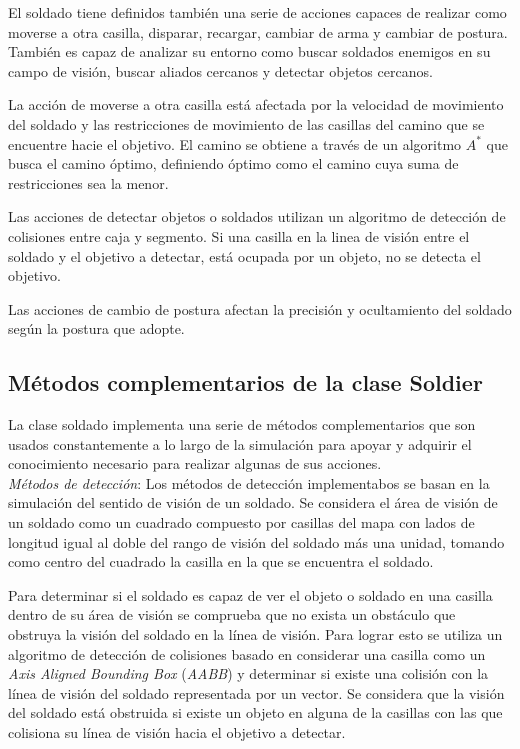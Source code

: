 \documentclass[twoside]{article}
\begin{document}
		El soldado tiene definidos tambi\'en una serie de acciones capaces de realizar como moverse a otra casilla, disparar, recargar, cambiar de arma y cambiar de postura. Tambi\'en es capaz de analizar su entorno como buscar soldados enemigos en su campo de visi\'on, buscar aliados cercanos y detectar objetos cercanos.
		
		La acci\'on de moverse a otra casilla est\'a afectada por la velocidad de movimiento del soldado y las restricciones de movimiento de las casillas del camino que se encuentre hacie el objetivo. El camino se obtiene a trav\'es de un algoritmo $A^*$ que busca el camino \'optimo, definiendo \'optimo como el camino cuya suma de restricciones sea la menor.
		
		Las acciones de detectar objetos o soldados utilizan un algoritmo de detecci\'on de colisiones entre caja y segmento. Si una casilla en la linea de visi\'on entre el soldado y el objetivo a detectar, est\'a ocupada por un objeto, no se detecta el objetivo.
		
		Las acciones de cambio de postura afectan la precisi\'on y ocultamiento del soldado seg\'un la postura que adopte.
		
		\subsection{M\'etodos complementarios de la clase Soldier}
		
		La clase soldado implementa una serie de m\'etodos complementarios que son usados constantemente a lo largo de la simulaci\'on para apoyar y adquirir el conocimiento necesario para realizar algunas de sus acciones.\\
		
		\emph{M\'etodos de detecci\'on}: Los m\'etodos de detecci\'on implementabos se basan en la simulaci\'on del sentido de visi\'on de un soldado. Se considera el \'area de visi\'on de un soldado como un cuadrado compuesto por casillas del mapa con lados de longitud igual al doble del rango de visi\'on del soldado m\'as una unidad, tomando como centro del cuadrado la casilla en la que se encuentra el soldado. 
		
		Para determinar si el soldado es capaz de ver el objeto o soldado en una casilla dentro de su \'area de visi\'on se comprueba que no exista un obst\'aculo que obstruya la visi\'on del soldado en la l\'inea de visi\'on. Para lograr esto se utiliza un algoritmo de detecci\'on de colisiones basado en considerar una casilla como un \emph{Axis Aligned Bounding Box} (\emph{AABB}) y determinar si existe una colisi\'on con la l\'inea de visi\'on del soldado representada por un vector. Se considera que la visi\'on del soldado est\'a obstruida si existe un objeto en alguna de la casillas con las que colisiona su l\'inea de visi\'on hacia el objetivo a detectar.
		
\end{document}
